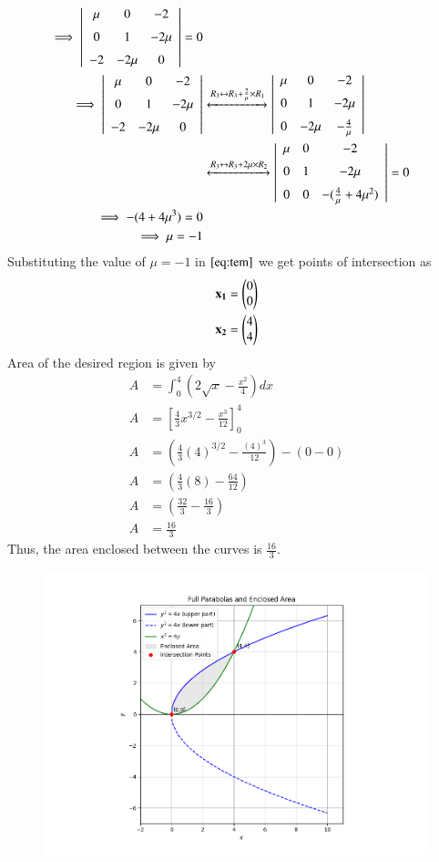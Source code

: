 \documentclass[journal]{IEEEtran}
\begin{document}
\begin{align}
    \implies 
\left|
\begin{array}{ccc}
\mu & 0 & -2 \\[6pt]
0 & 1  & -2\mu \\[6pt]
-2 & -2\mu & 0
\end{array}
\right| = 0 \\
\implies \left|
\begin{array}{ccc}
\mu & 0 & -2 \\[6pt]
0 & 1  & -2\mu \\[6pt]
-2 & -2\mu & 0
\end{array}
\right| &\xleftrightarrow{R_3 \leftrightarrow R_3 + \frac{2}{\mu}\times R_1} \left|
\begin{array}{ccc}
\mu & 0 & -2 \\[6pt]
0 & 1  & -2\mu \\[6pt]
0 & -2\mu & -\frac{4}{\mu}
\end{array}
\right|\\
&\xleftrightarrow{R_3 \leftrightarrow R_3 + 2\mu \times R_2} \left|
\begin{array}{ccc}
\mu & 0 & -2 \\[6pt]
0 & 1  & -2\mu \\[6pt]
0 & 0 & -(\frac{4}{\mu} +4 \mu ^2)
\end{array}
\right| =0\\
\implies -(4 + 4 \mu ^3)=0\\
\implies \mu=-1
\end{align}
Substituting the value of $\mu=-1$ in $\eqref{eq:tem}$ we get points of intersection as 
\begin{align}
    \mathbf{x_1}=\begin{pmatrix}0\\0\end{pmatrix} \\
    \mathbf{x_2}=\begin{pmatrix}4\\4\end{pmatrix}
\end{align}
Area of the desired region is given by
\begin{align}
A &= \int_{0}^{4}\left(2\sqrt{x}-\frac{x^2}{4}\right)dx\\
A &= \left[\frac{4}{3}x^{3/2} - \frac{x^3}{12}\right]_{0}^{4}\\
A &= \left(\frac{4}{3}(4)^{3/2} - \frac{(4)^3}{12}\right) - \left(0 - 0\right)\\
A &= \left(\frac{4}{3}(8) - \frac{64}{12}\right)\\
A &= \left(\frac{32}{3} - \frac{16}{3}\right)\\
A &= \frac{16}{3}
\end{align}
Thus, the area enclosed between the curves is $\frac{16}{3}$.
\begin{figure}[H]
\centering
\includegraphics[width=0.8\columnwidth]{figs/fig1.png}
\caption{}
\label{fig:1}
\end{figure}
\end{document}
